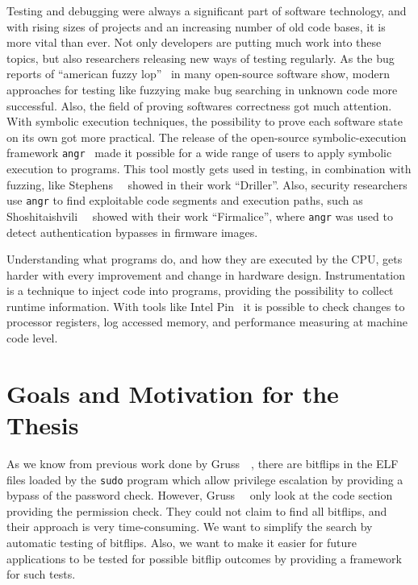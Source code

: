 Testing and debugging were always a significant part of software technology, and
with rising sizes of projects and an increasing number of old code bases, it is
more vital than ever. Not only developers are putting much work into these
topics, but also researchers releasing new ways of testing regularly. As the bug
reports of ``american fuzzy lop''~\cite{aflweb} in many open-source software
show, modern approaches for testing like fuzzying make bug searching in unknown
code more successful. Also, the field of proving software\textquotesingle s
correctness got much attention. With symbolic execution techniques, the
possibility to prove each software state on its own got more practical. The
release of the open-source symbolic-execution framework
\texttt{angr}~\cite{angrpaper} made it possible for a wide range of users to
apply symbolic execution to programs. This tool mostly gets used in testing, in
combination with fuzzing, like Stephens~\etal~\cite{driller} showed in their
work ``Driller''. Also, security researchers use \texttt{angr} to find
exploitable code segments and execution paths, such as
Shoshitaishvili~\etal~\cite{firmalice} showed with their work ``Firmalice'',
where \texttt{angr} was used to detect authentication bypasses in firmware
images.

Understanding what programs do, and how they are executed by the CPU, gets
harder with every improvement and change in hardware design. Instrumentation is
a technique to inject code into programs, providing the possibility to collect
runtime information. With tools like Intel Pin~\cite{pintool} it is possible to
check changes to processor registers, log accessed memory, and performance
measuring at machine code level.

\section{Goals and Motivation for the Thesis}

As we know from previous work done by Gruss~\etal~\cite{flipinthewall}, there
are bitflips in the ELF files loaded by the \texttt{sudo} program which allow
privilege escalation by providing a bypass of the password check. However,
Gruss~\etal~\cite{flipinthewall} only look at the code section providing the
permission check. They could not claim to find all bitflips, and their approach
is very time-consuming. We want to simplify the search by automatic testing of
bitflips. Also, we want to make it easier for future applications to be tested
for possible bitflip outcomes by providing a framework for such tests.

